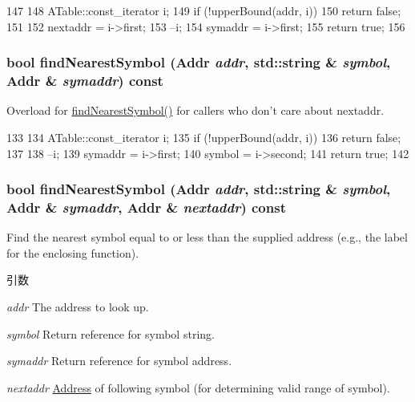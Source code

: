 \begin{DoxyCode}
147     {
148         ATable::const_iterator i;
149         if (!upperBound(addr, i))
150             return false;
151 
152         nextaddr = i->first;
153         --i;
154         symaddr = i->first;
155         return true;
156     }
\end{DoxyCode}
\hypertarget{classSymbolTable_a92050be34461e2a753aec9fc9df50d64}{
\subsubsection[{findNearestSymbol}]{\setlength{\rightskip}{0pt plus 5cm}bool findNearestSymbol ({\bf Addr} {\em addr}, \/  std::string \& {\em symbol}, \/  {\bf Addr} \& {\em symaddr}) const}}
\label{classSymbolTable_a92050be34461e2a753aec9fc9df50d64}
Overload for \hyperlink{classSymbolTable_a924f4948c47d7e7f08aee0527921629f}{findNearestSymbol()} for callers who don't care about nextaddr. 


\begin{DoxyCode}
133     {
134         ATable::const_iterator i;
135         if (!upperBound(addr, i))
136             return false;
137 
138         --i;
139         symaddr = i->first;
140         symbol = i->second;
141         return true;
142     }
\end{DoxyCode}
\hypertarget{classSymbolTable_a924f4948c47d7e7f08aee0527921629f}{
\subsubsection[{findNearestSymbol}]{\setlength{\rightskip}{0pt plus 5cm}bool findNearestSymbol ({\bf Addr} {\em addr}, \/  std::string \& {\em symbol}, \/  {\bf Addr} \& {\em symaddr}, \/  {\bf Addr} \& {\em nextaddr}) const}}
\label{classSymbolTable_a924f4948c47d7e7f08aee0527921629f}
Find the nearest symbol equal to or less than the supplied address (e.g., the label for the enclosing function). 
\begin{DoxyParams}{引数}
\item[{\em addr}]The address to look up. \item[{\em symbol}]Return reference for symbol string. \item[{\em symaddr}]Return reference for symbol address. \item[{\em nextaddr}]\hyperlink{classAddress}{Address} of following symbol (for determining valid range of symbol). \end{DoxyParams}

